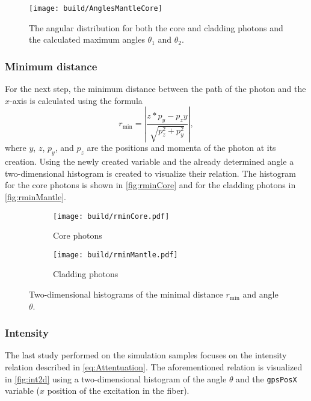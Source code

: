 \begin{figure}[H]
	\centering
	\texttt{[image: build/AnglesMantleCore]}
	\caption{The angular distribution for both the core and cladding photons and the calculated maximum angles $\theta_1$ and $\theta_2$.}
	\label{fig:anglesmantlecore}
\end{figure}


\subsubsection{Minimum distance}

For the next step, the minimum distance between the path of the photon and the $x$-axis is calculated using the formula 
\begin{equation*}
	r_\mathrm{min} = \left|\frac{z*p_y - p_zy}{\sqrt{p_z^2 + p_y^2}}\right|,
\end{equation*}
where $y$, $z$, $p_y$, and $p_z$ are the positions and momenta of the photon at its creation. Using the newly created variable and the already determined angle a two-dimensional histogram is created to visualize their relation. The histogram for the core photons is shown in \autoref{fig:rminCore} and for the cladding photons in \autoref{fig:rminMantle}.

\begin{figure}[H]
	\centering
	\begin{subfigure}{0.45\textwidth}
		\texttt{[image: build/rminCore.pdf]}
		\caption{Core photons}
		\label{fig:rminCore}
	\end{subfigure}
	\begin{subfigure}{0.45\textwidth}
		\texttt{[image: build/rminMantle.pdf]}
		\caption{Cladding photons}
		\label{fig:rminMantle}
	\end{subfigure} 
	\caption{Two-dimensional histograms of the minimal distance $r_\mathrm{min}$ and angle $\theta$.}
	\label{fig:rmin}
\end{figure}
\newpage
\subsubsection{Intensity}
The last study performed on the simulation samples focuses on the intensity relation described in \eqref{eq:Attentuation}. 
The aforementioned relation is visualized in \autoref{fig:int2d} using a two-dimensional histogram of the angle 
$\theta$ and the \texttt{gpsPosX} variable ($x$ position of the excitation in the fiber). 



